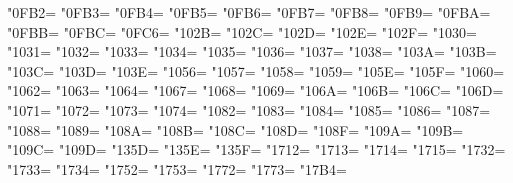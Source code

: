 \XeTeXcharclass"0FB2=\KclassCM
\XeTeXcharclass"0FB3=\KclassCM
\XeTeXcharclass"0FB4=\KclassCM
\XeTeXcharclass"0FB5=\KclassCM
\XeTeXcharclass"0FB6=\KclassCM
\XeTeXcharclass"0FB7=\KclassCM
\XeTeXcharclass"0FB8=\KclassCM
\XeTeXcharclass"0FB9=\KclassCM
\XeTeXcharclass"0FBA=\KclassCM
\XeTeXcharclass"0FBB=\KclassCM
\XeTeXcharclass"0FBC=\KclassCM
\XeTeXcharclass"0FC6=\KclassCM
\XeTeXcharclass"102B=\KclassCM
\XeTeXcharclass"102C=\KclassCM
\XeTeXcharclass"102D=\KclassCM
\XeTeXcharclass"102E=\KclassCM
\XeTeXcharclass"102F=\KclassCM
\XeTeXcharclass"1030=\KclassCM
\XeTeXcharclass"1031=\KclassCM
\XeTeXcharclass"1032=\KclassCM
\XeTeXcharclass"1033=\KclassCM
\XeTeXcharclass"1034=\KclassCM
\XeTeXcharclass"1035=\KclassCM
\XeTeXcharclass"1036=\KclassCM
\XeTeXcharclass"1037=\KclassCM
\XeTeXcharclass"1038=\KclassCM
\XeTeXcharclass"103A=\KclassCM
\XeTeXcharclass"103B=\KclassCM
\XeTeXcharclass"103C=\KclassCM
\XeTeXcharclass"103D=\KclassCM
\XeTeXcharclass"103E=\KclassCM
\XeTeXcharclass"1056=\KclassCM
\XeTeXcharclass"1057=\KclassCM
\XeTeXcharclass"1058=\KclassCM
\XeTeXcharclass"1059=\KclassCM
\XeTeXcharclass"105E=\KclassCM
\XeTeXcharclass"105F=\KclassCM
\XeTeXcharclass"1060=\KclassCM
\XeTeXcharclass"1062=\KclassCM
\XeTeXcharclass"1063=\KclassCM
\XeTeXcharclass"1064=\KclassCM
\XeTeXcharclass"1067=\KclassCM
\XeTeXcharclass"1068=\KclassCM
\XeTeXcharclass"1069=\KclassCM
\XeTeXcharclass"106A=\KclassCM
\XeTeXcharclass"106B=\KclassCM
\XeTeXcharclass"106C=\KclassCM
\XeTeXcharclass"106D=\KclassCM
\XeTeXcharclass"1071=\KclassCM
\XeTeXcharclass"1072=\KclassCM
\XeTeXcharclass"1073=\KclassCM
\XeTeXcharclass"1074=\KclassCM
\XeTeXcharclass"1082=\KclassCM
\XeTeXcharclass"1083=\KclassCM
\XeTeXcharclass"1084=\KclassCM
\XeTeXcharclass"1085=\KclassCM
\XeTeXcharclass"1086=\KclassCM
\XeTeXcharclass"1087=\KclassCM
\XeTeXcharclass"1088=\KclassCM
\XeTeXcharclass"1089=\KclassCM
\XeTeXcharclass"108A=\KclassCM
\XeTeXcharclass"108B=\KclassCM
\XeTeXcharclass"108C=\KclassCM
\XeTeXcharclass"108D=\KclassCM
\XeTeXcharclass"108F=\KclassCM
\XeTeXcharclass"109A=\KclassCM
\XeTeXcharclass"109B=\KclassCM
\XeTeXcharclass"109C=\KclassCM
\XeTeXcharclass"109D=\KclassCM
\XeTeXcharclass"135D=\KclassCM
\XeTeXcharclass"135E=\KclassCM
\XeTeXcharclass"135F=\KclassCM
\XeTeXcharclass"1712=\KclassCM
\XeTeXcharclass"1713=\KclassCM
\XeTeXcharclass"1714=\KclassCM
\XeTeXcharclass"1715=\KclassCM
\XeTeXcharclass"1732=\KclassCM
\XeTeXcharclass"1733=\KclassCM
\XeTeXcharclass"1734=\KclassCM
\XeTeXcharclass"1752=\KclassCM
\XeTeXcharclass"1753=\KclassCM
\XeTeXcharclass"1772=\KclassCM
\XeTeXcharclass"1773=\KclassCM
\XeTeXcharclass"17B4=\KclassCM
